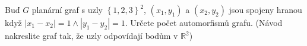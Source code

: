 Buď $G$ planární graf s uzly $\left \{ 1,2,3 \right \}^{2}$, $\left (
x_{1},y_{1} \right )$ a $\left ( x_{2},y_{2} \right )$ jsou spojeny hranou když
$\left | x_{1}-x_{2} \right |=1 \wedge \left | y_{1}-y_{2} \right |=1 $. Určete
počet automorfismů grafu. (Návod nakreslite graf tak, že uzly odpovídají bodům v
$\mathbb{R}^{2}$)
